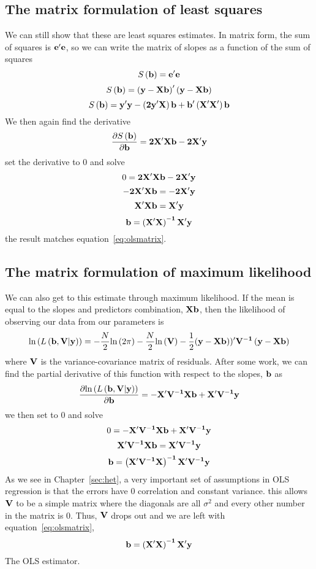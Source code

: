 \subsection{The matrix formulation of least squares}

We can still show that these are least squares estimates. In matrix form, the sum of squares is $\bf e'e$, so we can write the matrix of slopes as a function of the sum of squares
\[
S\left({\bf b}\right)={\bf e'e}
\]
\[
S\left({\bf b}\right)={\bf \left(y-Xb\right)'\left(y-Xb\right)}
\]
\begin{equation}
S\left({\bf b}\right)={\bf y'y-\left(2y'X\right)b+b'\left(X'X'\right)b}
\end{equation}
We then again find the derivative
\begin{equation}
\frac{\partial S\left({\bf b}\right)}{\partial {\bf b}}={\bf 2X'Xb-2X'y}
\end{equation}
set the derivative to 0 and solve
\[
0={\bf 2X'Xb-2X'y}
\]
\[
{\bf -2X'Xb}={\bf -2X'y}
\]
\[
{\bf X'Xb}={\bf X'y}
\]
\[
{\bf b}={\bf \left(X'X\right)^{-1}X'y}
\]
the result matches equation~\eqref{eq:olsmatrix}.

\subsection{The matrix formulation of maximum likelihood}
\label{sec:regml}

We can also get to this estimate through maximum likelihood. If the mean is equal to the slopes and predictors combination, $\bf Xb$, then the likelihood of observing our data from our parameters is
\begin{equation}
\mbox{ln}\left(L\left({\bf b, V \vert \bf y}\right)\right)=-\frac{N}{2}\mbox{ln}\left(2\pi\right)-\frac{N}{2}\mbox{ln}\left(\bf V\right)-\frac{1}{2}{\bf \left(y-Xb\right))'V^{-1}\left(y-Xb\right)}
\end{equation}
 where $\bf V$ is the variance-covariance matrix of residuals. After some work, we can find the partial derivative of this function with respect to the slopes, $\bf b$ as
\begin{equation}
\frac{\partial\mbox{ln}\left(L\left({\bf b, V \vert \bf y}\right)\right)}{\partial \bf b} = {\bf -X'V^{-1}Xb+X'V^{-1}y}
\end{equation}
we then set to 0 and solve
\[
0= {\bf -X'V^{-1}Xb+X'V^{-1}y}
\]
\[
{\bf X'V^{-1}Xb}= {\bf X'V^{-1}y}
\]
\[
{\bf b}= {\bf \left(X'V^{-1}X\right)^{-1}X'V^{-1}y}
\]
As we see in Chapter~\ref{sec:het}, a very important set of assumptions in OLS regression is that the errors have 0 correlation and constant variance. this allows $\bf V$ to be a simple matrix where the diagonals are all $\sigma^2$ and every other number in the matrix is 0. Thus, $\bf V$ drops out and we are left with equation~\eqref{eq:olsmatrix},
\[
{\bf b}={\bf \left(X'X\right)^{-1}X'y}
\]
 The OLS estimator.

